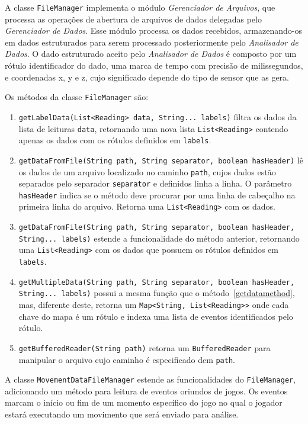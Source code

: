 A classe \texttt{FileManager} implementa o módulo \emph{Gerenciador de Arquivos}, que processa as operações de abertura de arquivos de dados delegadas pelo \emph{Gerenciador de Dados}. Esse módulo processa os dados recebidos, armazenando-os em dados estruturados para serem processado posteriormente pelo \emph{Analisador de Dados}. O dado estruturado aceito pelo \emph{Analisador de Dados} é composto por um rótulo identificador do dado, uma marca de tempo com precisão de milissegundos, e coordenadas x, y e z, cujo significado depende do tipo de sensor que as gera.

Os métodos da classe \texttt{FileManager} são:
\begin{enumerate}
	\item \texttt{getLabelData(List<Reading> data, String... labels)} filtra os dados da lista de leituras \texttt{data}, retornando uma nova lista \texttt{List<Reading>} contendo apenas os dados com os rótulos definidos em \texttt{labels}.
	\item \texttt{getDataFromFile(String path, String separator, boolean hasHeader)} lê os dados de um arquivo localizado no caminho \texttt{path}, cujos dados estão separados pelo separador \texttt{separator} e definidos linha a linha. O parâmetro \texttt{hasHeader} indica se o método deve procurar por uma linha de cabeçalho na primeira linha do arquivo. Retorna uma \texttt{List<Reading>} com os dados.
	\item \label{getdatamethod} \texttt{getDataFromFile(String path, String separator, boolean hasHeader, String... labels)} estende a funcionalidade do método anterior, retornando uma \texttt{List<Reading>} com os dados que possuem os rótulos definidos em \texttt{labels}.
	\item \texttt{getMultipleData(String path, String separator, boolean hasHeader, String... labels)} possui a mesma função que o método~\ref{getdatamethod}, mas, diferente deste, retorna um \texttt{Map<String, List<Reading>>} onde cada chave do mapa é um rótulo e indexa uma lista de eventos identificados pelo rótulo.
	\item \texttt{getBufferedReader(String path)} retorna um \texttt{BufferedReader} para manipular o arquivo cujo caminho é especificado dem \texttt{path}.
\end{enumerate}

A classe \texttt{MovementDataFileManager} estende as funcionalidades do \texttt{FileManager}, adicionando um método para leitura de eventos oriundos de jogos. Os eventos marcam o início ou fim de um momento específico do jogo no qual o jogador estará executando um movimento que será enviado para análise.


